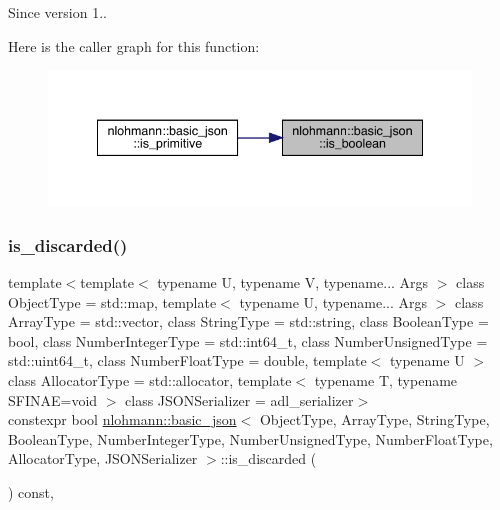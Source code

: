 \begin{DoxySince}{Since}
version 1.. 
\end{DoxySince}
Here is the caller graph for this function\+:
\nopagebreak
\begin{figure}[H]
\begin{center}
\leavevmode
\includegraphics[width=341pt]{classnlohmann_1_1basic__json_a943e8cb182d0f2365c76d64b42eaa6fd_icgraph}
\end{center}
\end{figure}
\mbox{\label{classnlohmann_1_1basic__json_aabe623bc8304c2ba92d96d91f390fab4}} 
\subsubsection{\texorpdfstring{is\_discarded()}{is\_discarded()}}
{\footnotesize\ttfamily template$<$template$<$ typename U, typename V, typename... Args $>$ class Object\+Type = std\+::map, template$<$ typename U, typename... Args $>$ class Array\+Type = std\+::vector, class String\+Type  = std\+::string, class Boolean\+Type  = bool, class Number\+Integer\+Type  = std\+::int64\+\_\+t, class Number\+Unsigned\+Type  = std\+::uint64\+\_\+t, class Number\+Float\+Type  = double, template$<$ typename U $>$ class Allocator\+Type = std\+::allocator, template$<$ typename T, typename S\+F\+I\+N\+A\+E=void $>$ class J\+S\+O\+N\+Serializer = adl\+\_\+serializer$>$ \\
constexpr bool \mbox{\hyperlink{classnlohmann_1_1basic__json}{nlohmann\+::basic\+\_\+json}}$<$ Object\+Type, Array\+Type, String\+Type, Boolean\+Type, Number\+Integer\+Type, Number\+Unsigned\+Type, Number\+Float\+Type, Allocator\+Type, J\+S\+O\+N\+Serializer $>$\+::is\+\_\+discarded (\begin{DoxyParamCaption}{ }\end{DoxyParamCaption}) const\hspace{0.3cm}{\ttfamily [inline]}, {\ttfamily [noexcept]}}



